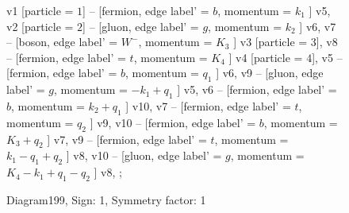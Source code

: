 \documentclass{revtex4}
\begin{document}
\begin{figure}[!htb]
\begin{center}
{    %
v1 [particle = \(1\)] -- [fermion, edge label' = \(b\), momentum = \(k_{1}\) ] v5, 
v2 [particle = \(2\)] -- [gluon, edge label' = \(g\), momentum = \(k_{2}\) ] v6, 
v7 -- [boson, edge label' = \(W^{-}\), momentum = \(K_{3}\) ] v3 [particle = \(3\)], 
v8 -- [fermion, edge label' = \(t\), momentum = \(K_{4}\) ] v4 [particle = \(4\)], 
v5 -- [fermion, edge label' = \(b\), momentum = \(q_{1}\) ] v6, 
v9 -- [gluon, edge label' = \(g\), momentum = \(-k_{1} + q_{1}\) ] v5, 
v6 -- [fermion, edge label' = \(b\), momentum = \(k_{2} + q_{1}\) ] v10, 
v7 -- [fermion, edge label' = \(t\), momentum = \(q_{2}\) ] v9, 
v10 -- [fermion, edge label' = \(b\), momentum = \(K_{3} + q_{2}\) ] v7, 
v9 -- [fermion, edge label' = \(t\), momentum = \(k_{1} - q_{1} + q_{2}\) ] v8, 
v10 -- [gluon, edge label' = \(g\), momentum = \(K_{4} - k_{1} + q_{1} - q_{2}\) ] v8, 
};
\end{center}
\caption{Diagram199, Sign: 1, Symmetry factor: 1}
\end{figure}
\newpage
\end{document}
